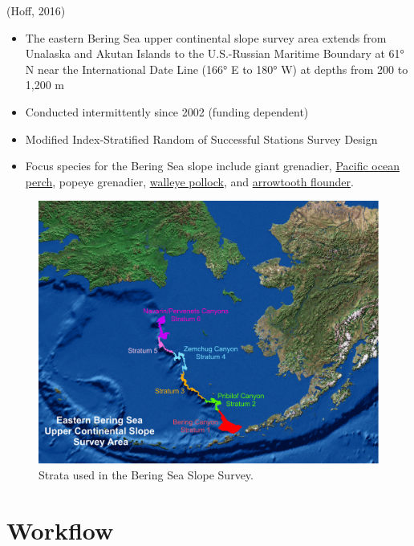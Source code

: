 \documentclass[
  letterpaper,
  oneside,
  open=any]{scrbook}
\providecommand{\tightlist}{%
  \setlength{\itemsep}{0pt}\setlength{\parskip}{0pt}}\usepackage{longtable,booktabs,array}
\begin{document}
(Hoff, 2016)

\begin{itemize}
\tightlist
\item
  The eastern Bering Sea upper continental slope survey area extends
  from Unalaska and Akutan Islands to the U.S.-Russian Maritime Boundary
  at 61° N near the International Date Line (166° E to 180° W) at depths
  from 200 to 1,200 m
\item
  Conducted intermittently since 2002 (funding dependent)
\item
  Modified Index-Stratified Random of Successful Stations Survey Design
\item
  Focus species for the Bering Sea slope include giant grenadier,
  \href{https://www.fisheries.noaa.gov/species/pacific-ocean-perch}{Pacific
  ocean perch}, popeye grenadier,
  \href{https://www.fisheries.noaa.gov/species/alaska-pollock}{walleye
  pollock}, and
  \href{https://www.fisheries.noaa.gov/species/arrowtooth-flounder}{arrowtooth
  flounder}.
\end{itemize}

\begin{figure}

{\centering \includegraphics[width=7.33in,height=\textheight]{content/../img/bss-strata.png}

}

\caption{Strata used in the Bering Sea Slope Survey.}

\end{figure}

\hypertarget{workflow}{%
\chapter{Workflow}\label{workflow}}
\end{document}
